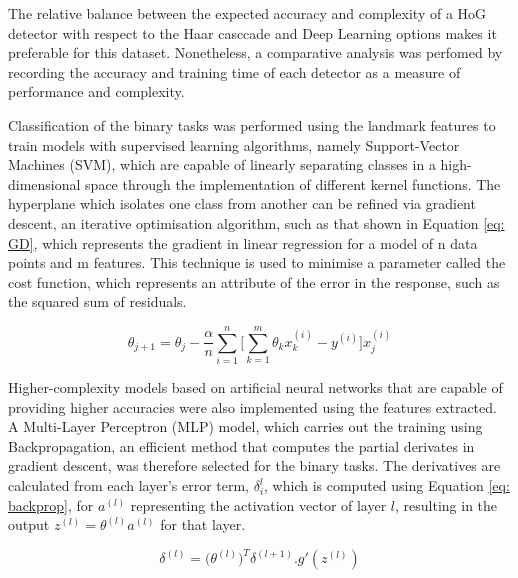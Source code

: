 \documentclass[conference]{IEEEtran}
\begin{document}
The relative balance between the expected accuracy and complexity of a HoG detector with respect to the Haar casccade and Deep Learning options makes it preferable for this dataset. Nonetheless, a comparative analysis was perfomed by recording the accuracy and training time of each detector as a measure of performance and complexity.

Classification of the binary tasks was performed using the landmark features to train models with supervised learning algorithms, namely Support-Vector Machines (SVM), which are capable of linearly separating classes in a high-dimensional space through the implementation of different kernel functions. 
The hyperplane which isolates one class from another can be refined via gradient descent, an iterative optimisation algorithm, such as that shown in Equation \ref{eq: GD}, which represents the gradient in linear regression for a model of n data points and m features. This technique is used to minimise a parameter called the cost function, which represents an attribute of the error in the response, such as the squared sum of residuals.

\begin{equation}
\theta_{j+1} = \theta_j - \frac{\alpha}{n} \sum_{i=1}^n \bigg[\sum_{k=1}^m \theta_k x_k^{(i)} - y^{(i)} \bigg] x_j^{(i)} 
\label{eq: GD}
\end{equation}

Higher-complexity models based on artificial neural networks that are capable of providing higher accuracies were also implemented using the features extracted. A Multi-Layer Perceptron (MLP) model, which carries out the training using Backpropagation, an efficient method that computes the partial derivates in gradient descent, was therefore selected for the binary tasks. The derivatives are calculated from each layer's error term, $\delta_i^l$, which is computed using Equation \ref{eq: backprop}, for $a^{(l)}$ representing the activation vector of layer $l$, resulting in the output $z^{(l)} = \theta^{(l)} a^{(l)}$ for that layer.

\begin{equation}
\delta^{(l)} = \big(\theta^{(l)}\big)^T \delta^{(l+1)}.g'(z^{(l)})
\label{eq: backprop}
\end{equation}
\end{document}
